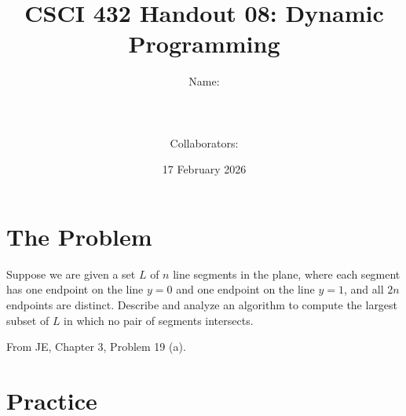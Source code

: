\documentclass{article}
\title{CSCI 432 Handout 08: Dynamic Programming}
\author{Name: \rule{3in}{0.15mm} \\~\\
    Collaborators: \rule{3in}{0.15mm} }
\date{17 February 2026}
\begin{document}
\maketitle

\noindent
\section*{The Problem}

Suppose we are given a set $L$ of $n$ line segments in the plane, where each
segment has one endpoint on the line $y=0$ and one endpoint on the line $y=1$,
and all $2n$ endpoints are distinct. Describe and analyze an algorithm to
compute the largest subset of $L$ in which no pair of segments intersects.

From JE, Chapter 3, Problem 19 (a).

\section*{Practice}
\end{document}
